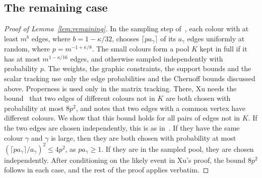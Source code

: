 \subsection{The remaining case}
\begin{proof}[Proof of Lemma~\ref{lem:remaining}]
In the sampling step of~\cite[Lemma~6.1]{Xu}, each colour with at least $m^b$ edges, where $b=1-\kappa/32$, chooses $\lceil pa_\gamma\rceil$ of its $a_\gamma$ edges uniformly at random, where $p=m^{-1+\kappa/8}$. The small colours form a pool $K$ kept in full if it has at most $m^{1-\kappa/16}$ edges, and otherwise sampled independently with probability $p$.
The weights, the graphic constraints, the support bounds and the scalar tracking use only the edge probabilities and the Chernoff bounds discussed above.
Properness is used only in the matrix tracking. There, Xu needs the bound~\cite[(6.11)]{Xu} that two edges of different colours not in $K$ are both chosen with probability at most $8p^2$, and notes that two edges with a common vertex have different colours.
We show that this bound holds for all pairs of edges not in $K$.
If the two edges are chosen independently, this is as in~\cite{Xu}.
If they have the same colour $\gamma$ and $\gamma$ is large, then they are both chosen with probability at most $(\lceil pa_\gamma\rceil/a_\gamma)^2\le4p^2$, as $pa_\gamma\ge1$.
If they are in the sampled pool, they are chosen independently.
After conditioning on the likely event in Xu's proof, the bound $8p^2$ follows in each case, and the rest of the proof applies verbatim.
\end{proof}
